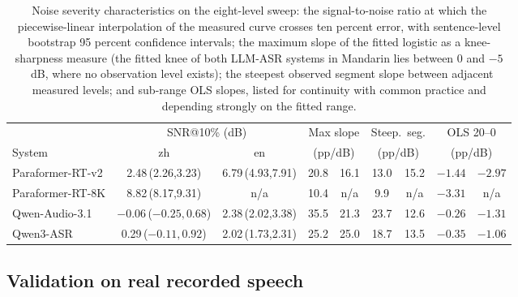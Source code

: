 \begin{table}[t]
\centering
\caption{Noise severity characteristics on the eight-level sweep: the
signal-to-noise ratio at which the piecewise-linear interpolation of the
measured curve crosses ten percent error, with sentence-level bootstrap 95
percent confidence intervals; the maximum slope of the fitted logistic as
a knee-sharpness measure (the fitted knee of both LLM-ASR systems in
Mandarin lies between 0 and $-5$~dB, where no observation level exists);
the steepest observed segment slope between adjacent measured levels; and
sub-range OLS slopes, listed for continuity with common practice and
depending strongly on the fitted range.}
\label{tab:slopes}
\footnotesize
\setlength{\tabcolsep}{1.5pt}
\begin{tabular}{lcccccccc}
\toprule
 & \multicolumn{2}{c}{SNR@10\% (dB)} & \multicolumn{2}{c}{Max slope} & \multicolumn{2}{c}{Steep.\ seg.} & \multicolumn{2}{c}{OLS 20--0} \\
System & zh & en & \multicolumn{2}{c}{(pp/dB)} & \multicolumn{2}{c}{(pp/dB)} & \multicolumn{2}{c}{(pp/dB)} \\
\midrule
Paraformer-RT-v2 & 2.48\,(2.26,3.23) & 6.79\,(4.93,7.91) & 20.8 & 16.1 & 13.0 & 15.2 & $-1.44$ & $-2.97$ \\
Paraformer-RT-8K & 8.82\,(8.17,9.31) & n/a & 10.4 & n/a & 9.9 & n/a & $-3.31$ & n/a \\
Qwen-Audio-3.1 & $-0.06$\,($-0.25,0.68$) & 2.38\,(2.02,3.38) & 35.5 & 21.3 & 23.7 & 12.6 & $-0.26$ & $-1.31$ \\
Qwen3-ASR & 0.29\,($-0.11,0.92$) & 2.02\,(1.73,2.31) & 25.2 & 25.0 & 18.7 & 13.5 & $-0.35$ & $-1.06$ \\
\bottomrule
\end{tabular}
\end{table}

\subsection{Validation on real recorded speech}
\label{sec:results:real}

